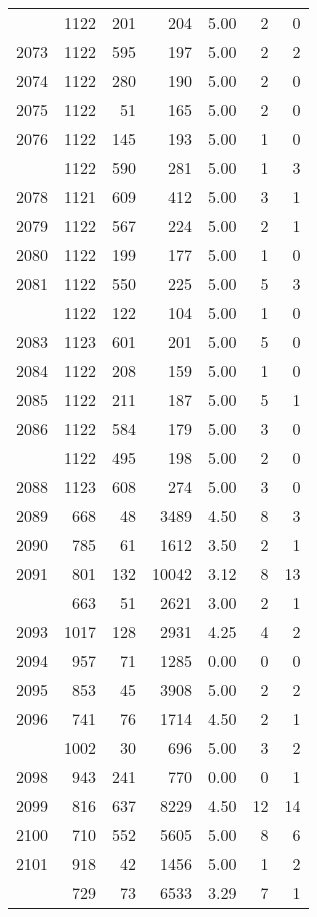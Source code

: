 \documentclass[
]{article}
\begin{document}
\begin{table}
\begin{tabular}[t]{lrrrrrr}
\addlinespace
2072 & 1122 & 201 & 204 & 5.00 & 2 & 0\\
2073 & 1122 & 595 & 197 & 5.00 & 2 & 2\\
2074 & 1122 & 280 & 190 & 5.00 & 2 & 0\\
2075 & 1122 & 51 & 165 & 5.00 & 2 & 0\\
2076 & 1122 & 145 & 193 & 5.00 & 1 & 0\\
\addlinespace
2077 & 1122 & 590 & 281 & 5.00 & 1 & 3\\
2078 & 1121 & 609 & 412 & 5.00 & 3 & 1\\
2079 & 1122 & 567 & 224 & 5.00 & 2 & 1\\
2080 & 1122 & 199 & 177 & 5.00 & 1 & 0\\
2081 & 1122 & 550 & 225 & 5.00 & 5 & 3\\
\addlinespace
2082 & 1122 & 122 & 104 & 5.00 & 1 & 0\\
2083 & 1123 & 601 & 201 & 5.00 & 5 & 0\\
2084 & 1122 & 208 & 159 & 5.00 & 1 & 0\\
2085 & 1122 & 211 & 187 & 5.00 & 5 & 1\\
2086 & 1122 & 584 & 179 & 5.00 & 3 & 0\\
\addlinespace
2087 & 1122 & 495 & 198 & 5.00 & 2 & 0\\
2088 & 1123 & 608 & 274 & 5.00 & 3 & 0\\
2089 & 668 & 48 & 3489 & 4.50 & 8 & 3\\
2090 & 785 & 61 & 1612 & 3.50 & 2 & 1\\
2091 & 801 & 132 & 10042 & 3.12 & 8 & 13\\
\addlinespace
2092 & 663 & 51 & 2621 & 3.00 & 2 & 1\\
2093 & 1017 & 128 & 2931 & 4.25 & 4 & 2\\
2094 & 957 & 71 & 1285 & 0.00 & 0 & 0\\
2095 & 853 & 45 & 3908 & 5.00 & 2 & 2\\
2096 & 741 & 76 & 1714 & 4.50 & 2 & 1\\
\addlinespace
2097 & 1002 & 30 & 696 & 5.00 & 3 & 2\\
2098 & 943 & 241 & 770 & 0.00 & 0 & 1\\
2099 & 816 & 637 & 8229 & 4.50 & 12 & 14\\
2100 & 710 & 552 & 5605 & 5.00 & 8 & 6\\
2101 & 918 & 42 & 1456 & 5.00 & 1 & 2\\
\addlinespace
2102 & 729 & 73 & 6533 & 3.29 & 7 & 1\\

\end{tabular}
\end{table}
\end{document}
